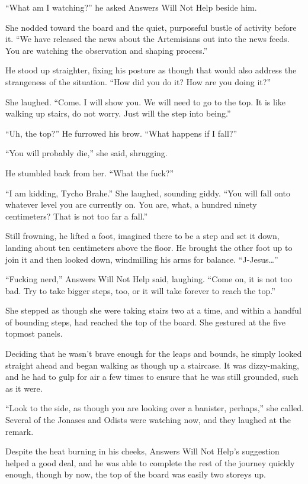``What am I watching?'' he asked Answers Will Not Help beside him.

She nodded toward the board and the quiet, purposeful bustle of activity before it. ``We have released the news about the Artemisians out into the news feeds. You are watching the observation and shaping process.''

He stood up straighter, fixing his posture as though that would also address the strangeness of the situation. ``How did you do it? How are you doing it?''

She laughed. ``Come. I will show you. We will need to go to the top. It is like walking up stairs, do not worry. Just will the step into being.''

``Uh, the top?'' He furrowed his brow. ``What happens if I fall?''

``You will probably die,'' she said, shrugging.

He stumbled back from her. ``What the fuck?''

``I am kidding, Tycho Brahe.'' She laughed, sounding giddy. ``You will fall onto whatever level you are currently on. You are, what, a hundred ninety centimeters? That is not too far a fall.''

Still frowning, he lifted a foot, imagined there to be a step and set it down, landing about ten centimeters above the floor. He brought the other foot up to join it and then looked down, windmilling his arms for balance. ``J-Jesus\ldots{}''

``Fucking nerd,'' Answers Will Not Help said, laughing. ``Come on, it is not too bad. Try to take bigger steps, too, or it will take forever to reach the top.''

She stepped as though she were taking stairs two at a time, and within a handful of bounding steps, had reached the top of the board. She gestured at the five topmost panels.

Deciding that he wasn't brave enough for the leaps and bounds, he simply looked straight ahead and began walking as though up a staircase. It was dizzy-making, and he had to gulp for air a few times to ensure that he was still grounded, such as it were.

``Look to the side, as though you are looking over a banister, perhaps,'' she called. Several of the Jonases and Odists were watching now, and they laughed at the remark.

Despite the heat burning in his cheeks, Answers Will Not Help's suggestion helped a good deal, and he was able to complete the rest of the journey quickly enough, though by now, the top of the board was easily two storeys up.


